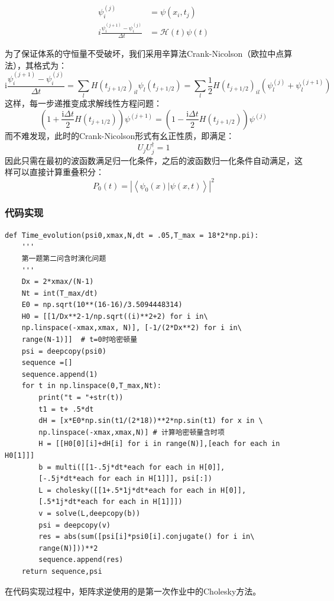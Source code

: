 \documentclass[a4paper]{ctexart}
\begin{document}
\begin{equation}
\begin{aligned}
\psi_{i}^{(j)}&=\psi\left(x_{i}, t_{j}\right)\\
i\frac{\psi_{i}^{(j+1)}-\psi_{i}^{(j)}}{\Delta t}&=\mathcal{H}(t)\psi(t)
\end{aligned}
\end{equation}

为了保证体系的守恒量不受破坏，我们采用辛算法Crank-Nicolson（欧拉中点算法），其格式为：
\begin{equation}
\mathrm{i} \frac{\psi_{i}^{(j+1)}-\psi_{i}^{(j)}}{\Delta t}=\sum_{l} H\left(t_{j+1 / 2}\right)_{i l} \psi_{l}\left(t_{j+1 / 2}\right)=\sum_{l} \frac{1}{2} H\left(t_{j+1 / 2}\right)_{i l}\left(\psi_{l}^{(j)}+\psi_{l}^{(j+1)}\right)
\end{equation}
这样，每一步递推变成求解线性方程问题：
\begin{equation}
\left(1+\frac{\mathrm{i} \Delta t}{2} H\left(t_{j+1 / 2}\right)\right) \psi^{(j+1)}=\left(1-\frac{\mathrm{i} \Delta t}{2} H\left(t_{j+1 / 2}\right)\right) \psi^{(j)}
\end{equation}
而不难发现，此时的Crank-Nicolson形式有幺正性质，即满足：
\begin{equation}
U_jU^{\dagger}_j=1
\end{equation}
因此只需在最初的波函数满足归一化条件，之后的波函数归一化条件自动满足，这样可以直接计算重叠积分：\begin{equation}
P_{0}(t)=\left|\left\langle\psi_{0}(x) | \psi(x, t)\right\rangle\right|^{2}
\end{equation}
\subsubsection{代码实现}
\begin{lstlisting}
def Time_evolution(psi0,xmax,N,dt = .05,T_max = 18*2*np.pi):
	'''
	第一题第二问含时演化问题
	'''
	Dx = 2*xmax/(N-1)
	Nt = int(T_max/dt)
	E0 = np.sqrt(10**(16-16)/3.5094448314)
	H0 = [[1/Dx**2-1/np.sqrt((i)**2+2) for i in\
	np.linspace(-xmax,xmax, N)], [-1/(2*Dx**2) for i in\
	range(N-1)]]  # t=0时哈密顿量
	psi = deepcopy(psi0)
	sequence =[]
	sequence.append(1)
	for t in np.linspace(0,T_max,Nt):
		print("t = "+str(t))
		t1 = t+ .5*dt
		dH = [x*E0*np.sin(t1/(2*18))**2*np.sin(t1) for x in \	
		np.linspace(-xmax,xmax,N)] # 计算哈密顿量含时项
		H = [[H0[0][i]+dH[i] for i in range(N)],[each for each in H0[1]]]
		b = multi([[1-.5j*dt*each for each in H[0]],
		[-.5j*dt*each for each in H[1]]], psi[:])
		L = cholesky([[1+.5*1j*dt*each for each in H[0]],
		[.5*1j*dt*each for each in H[1]]])
		v = solve(L,deepcopy(b))
		psi = deepcopy(v)
		res = abs(sum([psi[i]*psi0[i].conjugate() for i in\
		range(N)]))**2
		sequence.append(res)
	return sequence,psi
\end{lstlisting}
在代码实现过程中，矩阵求逆使用的是第一次作业中的Cholesky方法。
\end{document}
